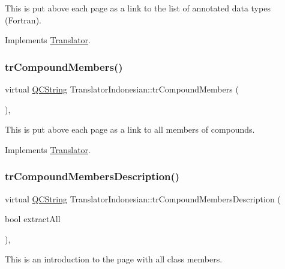 This is put above each page as a link to the list of annotated data types (Fortran). 

Implements \mbox{\hyperlink{class_translator}{Translator}}.

\mbox{\label{class_translator_indonesian_a1bc40ee76b6103b869add4f9ba1d2c01}} 
\subsubsection{\texorpdfstring{trCompoundMembers()}{trCompoundMembers()}}
{\footnotesize\ttfamily virtual \mbox{\hyperlink{class_q_c_string}{Q\+C\+String}} Translator\+Indonesian\+::tr\+Compound\+Members (\begin{DoxyParamCaption}{ }\end{DoxyParamCaption})\hspace{0.3cm}{\ttfamily [inline]}, {\ttfamily [virtual]}}

This is put above each page as a link to all members of compounds. 

Implements \mbox{\hyperlink{class_translator}{Translator}}.

\mbox{\label{class_translator_indonesian_a6215c7c4c485e7237abd02b0960bf9e8}} 
\subsubsection{\texorpdfstring{trCompoundMembersDescription()}{trCompoundMembersDescription()}}
{\footnotesize\ttfamily virtual \mbox{\hyperlink{class_q_c_string}{Q\+C\+String}} Translator\+Indonesian\+::tr\+Compound\+Members\+Description (\begin{DoxyParamCaption}\item[{bool}]{extract\+All }\end{DoxyParamCaption})\hspace{0.3cm}{\ttfamily [inline]}, {\ttfamily [virtual]}}

This is an introduction to the page with all class members. 


